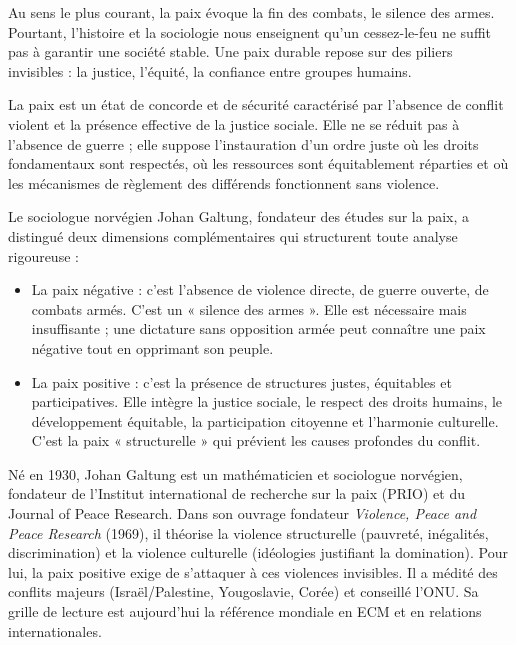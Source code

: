 \documentclass[11pt]{article}
\newcommand{\cle}[1]{{\popxbold\color{popdark}#1}}
\newcounter{popsec}
\newcounter{popsub}
\newcommand{\courssub}[1]{%
  \stepcounter{popsub}%
  \par\vspace{9pt}\noindent{\popxbold\fontsize{11.5}{13}\selectfont\color{popink}{\color{poporange}\thepopsec.\thepopsub}\hspace{6pt}#1}\par\nopagebreak\vspace{4pt}
}
\begin{document}
\courssub{Définition et dimensions de la paix}

Au sens le plus courant, la paix évoque la fin des combats, le silence des armes. Pourtant, l'histoire et la sociologie nous enseignent qu'un cessez-le-feu ne suffit pas à garantir une société stable. Une paix durable repose sur des piliers invisibles : la justice, l'équité, la confiance entre groupes humains.

\begin{definition}
La \cle{paix} est un état de concorde et de sécurité caractérisé par l'absence de conflit violent et la présence effective de la \cle{justice sociale}. Elle ne se réduit pas à l'absence de guerre ; elle suppose l'instauration d'un ordre juste où les droits fondamentaux sont respectés, où les ressources sont équitablement réparties et où les mécanismes de règlement des différends fonctionnent sans violence.
\end{definition}

Le sociologue norvégien \cle{Johan Galtung}, fondateur des études sur la paix, a distingué deux dimensions complémentaires qui structurent toute analyse rigoureuse :

\begin{itemize}
    \item La \cle{paix négative} : c'est l'absence de violence directe, de guerre ouverte, de combats armés. C'est un « silence des armes ». Elle est nécessaire mais insuffisante ; une dictature sans opposition armée peut connaître une paix négative tout en opprimant son peuple.
    \item La \cle{paix positive} : c'est la présence de structures justes, équitables et participatives. Elle intègre la justice sociale, le respect des droits humains, le développement équitable, la participation citoyenne et l'harmonie culturelle. C'est la paix « structurelle » qui prévient les causes profondes du conflit.
\end{itemize}

\begin{savaistu}
Né en 1930, Johan Galtung est un mathématicien et sociologue norvégien, fondateur de l'Institut international de recherche sur la paix (PRIO) et du Journal of Peace Research. Dans son ouvrage fondateur \emph{Violence, Peace and Peace Research} (1969), il théorise la \cle{violence structurelle} (pauvreté, inégalités, discrimination) et la \cle{violence culturelle} (idéologies justifiant la domination). Pour lui, la paix positive exige de s'attaquer à ces violences invisibles. Il a médité des conflits majeurs (Israël/Palestine, Yougoslavie, Corée) et conseillé l'ONU. Sa grille de lecture est aujourd'hui la référence mondiale en ECM et en relations internationales.
\end{savaistu}
\end{document}
